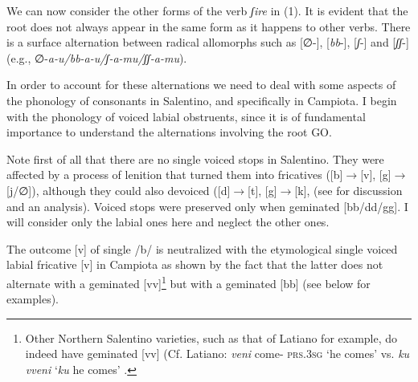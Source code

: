 \documentclass[output=paper]{langscibook}
\begin{document}
We can now consider the other forms of the verb \textit{ʃire}  in  (1).  It is evident that the root does not always appear in the same form as it happens to other verbs.  There is a surface alternation between radical allomorphs such as  [∅-], [\textit{bb}-], [\textit{ʃ}-]  and  [\textit{ʃʃ}-]  (e.g.,  ∅-\textit{a-u/bb-a-u/ʃ-a-mu/ʃʃ-a-mu}).

In order to account for these alternations we need to deal with some aspects of the phonology of consonants in Salentino, and specifically in Campiota.   I begin with the phonology of voiced labial obstruents, since it is of fundamental importance to understand the alternations involving the root GO.

Note first of all that there are no single voiced stops in Salentino.  They were affected by a process of lenition that turned them into fricatives ([b]$\rightarrow$[v], [g]$\rightarrow$ [j/∅]), although they could also devoiced ([d]$\rightarrow$[t], [g]$\rightarrow$[k], (see \citealt{calabrese1987a} for discussion and an analysis).  Voiced stops were preserved only when geminated [bb/dd/gg]. I will consider only the labial ones here and neglect the other ones.

The outcome [v] of single /b/ is neutralized with the etymological single voiced labial fricative [v] in Campiota as shown by the fact that  the latter does not alternate with a geminated [vv]\footnote{Other Northern Salentino varieties, such as that of Latiano for example, do indeed have geminated [vv] (Cf. Latiano: \textit{veni} come- \textsc{prs}.\textsc{3sg} ‘he comes’ vs. \textit{ku vveni} ‘\textit{ku} he comes’ \citep{urgese2003a}.}  but with a geminated [bb] (see below for examples).
\end{document}
